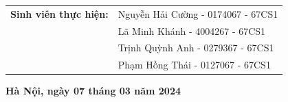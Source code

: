 \documentclass[main.tex]{subfiles}
\begin{document}
\begin{titlepage}
\begin{center}
\begin{table}[H]
\begin{tabular}{l l}
{\textbf{\fontsize{16pt}{0pt}\selectfont Sinh viên thực hiện:}} & {\fontsize{16pt}{0pt}\selectfont Nguyễn Hải Cường - 0174067 - 67CS1}\vspace{6pt}\\
& {\fontsize{16pt}{0pt}\selectfont Lã Minh Khánh - 4004267 - 67CS1}\vspace{6pt}\\
& {\fontsize{16pt}{0pt}\selectfont Trịnh Quỳnh Anh - 0279367 - 67CS1}\vspace{6pt}\\
& {\fontsize{16pt}{0pt}\selectfont Phạm Hồng Thái - 0127067 - 67CS1}\vspace{6pt}\\

\end{tabular}
\end{table}

\vspace{2cm}
\textbf{\fontsize{14pt}{0pt}\selectfont Hà Nội, ngày 07 tháng 03 năm 2024}\\

\end{center}
\end{titlepage}
\end{document}
